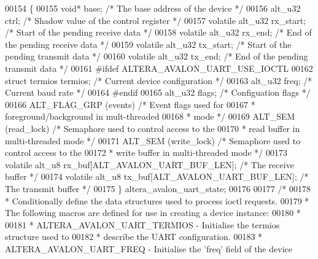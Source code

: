 \begin{DoxyCode}
00154 \{
00155   \textcolor{keywordtype}{void}*            base;            \textcolor{comment}{/* The base address of the device */}
00156   alt_u32          ctrl;            \textcolor{comment}{/* Shadow value of the control register */}
00157   \textcolor{keyword}{volatile} alt_u32 rx_start;        \textcolor{comment}{/* Start of the pending receive data */}
00158   \textcolor{keyword}{volatile} alt_u32 rx_end;          \textcolor{comment}{/* End of the pending receive data */}
00159   \textcolor{keyword}{volatile} alt_u32 tx_start;        \textcolor{comment}{/* Start of the pending transmit data */}
00160   \textcolor{keyword}{volatile} alt_u32 tx_end;          \textcolor{comment}{/* End of the pending transmit data */}
00161 \textcolor{preprocessor}{#ifdef ALTERA\_AVALON\_UART\_USE\_IOCTL}
00162   \textcolor{keyword}{struct }termios termios;           \textcolor{comment}{/* Current device configuration */}
00163   alt_u32          freq;            \textcolor{comment}{/* Current baud rate */}
00164 \textcolor{preprocessor}{#endif}
00165   alt_u32          flags;           \textcolor{comment}{/* Configuation flags */}
00166   ALT_FLAG_GRP     (events)         \textcolor{comment}{/* Event flags used for }
00167 \textcolor{comment}{                                     * foreground/background in mult-threaded}
00168 \textcolor{comment}{                                     * mode */}
00169   ALT_SEM          (read\_lock)      \textcolor{comment}{/* Semaphore used to control access to the }
00170 \textcolor{comment}{                                     * read buffer in multi-threaded mode */}
00171   ALT_SEM          (write\_lock)     \textcolor{comment}{/* Semaphore used to control access to the}
00172 \textcolor{comment}{                                     * write buffer in multi-threaded mode */}
00173   volatile alt_u8  rx\_buf[ALT_AVALON_UART_BUF_LEN]; \textcolor{comment}{/* The receive buffer */}
00174   volatile alt_u8  tx_buf[ALT\_AVALON\_UART\_BUF\_LEN]; \textcolor{comment}{/* The transmit buffer */}
00175 \} altera_avalon_uart_state;
00176 
00177 \textcolor{comment}{/*}
00178 \textcolor{comment}{ * Conditionally define the data structures used to process ioctl requests.}
00179 \textcolor{comment}{ * The following macros are defined for use in creating a device instance:}
00180 \textcolor{comment}{ *}
00181 \textcolor{comment}{ * ALTERA\_AVALON\_UART\_TERMIOS - Initialise the termios structure used to}
00182 \textcolor{comment}{ *                              describe the UART configuration.}
00183 \textcolor{comment}{ * ALTERA\_AVALON\_UART\_FREQ    - Initialise the 'freq' field of the device}

\end{DoxyCode}
